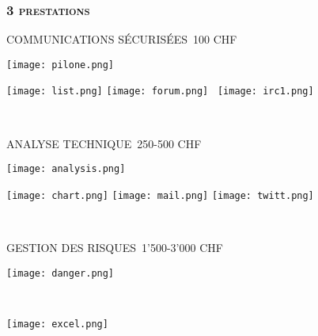 \documentclass[14pt,a4paper]{beamer}
\begin{document}
\begin{frame}

\vspace{5mm}
\frametitle{\color{title}\bf\textsc{3 prestations}}
\vspace{-3mm}





 
 \pause
 
\vspace{-4mm}
\begin{center}
\footnotesize COMMUNICATIONS SÉCURISÉES~100 CHF\\
\end{center}
\vspace{-3mm}
\parbox[c]{2cm}{\texttt{[image: pilone.png]}}\parbox[c]{2cm} {\texttt{[image: list.png]} \texttt{[image: forum.png]}~ \texttt{[image: irc1.png]}}\\

\pause


\begin{center}
\footnotesize ANALYSE TECHNIQUE~250-500 CHF \\
\end{center}
\vspace{-5mm}
\parbox[c]{2cm}{\texttt{[image: analysis.png]}}  \parbox[c]{2cm}{\texttt{[image: chart.png]}%
\texttt{[image: mail.png]} \texttt{[image: twitt.png]}}\\

\pause

\begin{center}
\footnotesize GESTION DES RISQUES~1'500-3'000 CHF \\
\end{center}
\vspace{-4mm}
\parbox[c]{2cm}{\texttt{[image: danger.png]}} ~~~\parbox[c]{2cm}{\texttt{[image: excel.png]}}



\end{frame}

\end{document}
